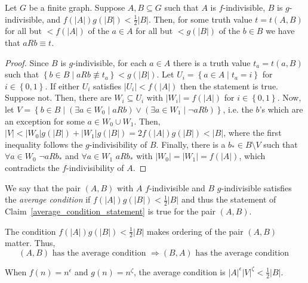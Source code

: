     \lemma[Claim 4.6)]\label{average_condition_statement}
    Let $G$ be a finite graph.
    Suppose $A, B \subseteq G$ such that $A$ is $f$-indivisible, $B$ is $g$-indivisible, and $f(|A|) g(|B|) < \frac{1}{2} |B|$.
    Then, for some truth value $t = t(A,B)$ for all but $< f(|A|)$ of the $a \in A$ for all but $< g(|B|)$ of the $b \in B$
        we have that $a R b \equiv t$.
        \begin{proof}
            Since $B$ is $g$-indivisible, for each $a \in A$ there is a truth value $t_a = t(a,B)$ such that
                $\left\{ b \in B \mid a R b \not\equiv t_a \right\} < g(|B|)$.
            Let $U_i = \left\{ a \in A \mid t_a = i \right\}$ for $i \in \left\{ 0,1 \right\}$.
            If either $U_i$ satisfies $|U_i| < f(|A|)$ then the statement is true.
            Suppose not.
            Then, there are $W_i \subseteq U_i$ with $|W_i| = f(|A|)$ for $i \in \left\{ 0,1 \right\}$.
            Now, let $V = \left\{ b \in B \mid (\exists a \in W_0 \mid a R b) \vee (\exists a \in W_1 \mid \lnot a R b) \right\}$,
                i.e. the $b$'s which are an exception for some $a \in W_0 \cup W_1$.
            Then, $|V| < |W_0| g(|B|) + |W_1| g(|B|) = 2 f(|A|) g(|B|) < |B|$, where the first inequality follows the
                $g$-indivisibility of $B$.
            Finally, there is a $b_* \in B \setminus V$ such that $\forall a \in W_0$ $\lnot a R b_*$ and
                $\forall a \in W_1$ $a R b_*$ with $|W_0| = |W_1| = f(|A|)$, which contradicts the $f$-indivisibility of $A$.
        \end{proof}

    We say that the pair $(A,B)$ with $A$ $f$-indivisible and $B$ $g$-indivisible satisfies the \emph{average condition} if
        $f(|A|) g(|B|) < \frac{1}{2} |B|$ and thus the statement of Claim~\ref{average_condition_statement} is true for
        the pair $(A,B)$.

    \remark
    The condition $f(|A|) g(|B|) < \frac{1}{2} |B|$ makes ordering of the pair $(A,B)$ matter.
    Thus,
    \[
        (A,B) \text{ has the average condition } \Rightarrow (B,A) \text{ has the average condition }
    \]

    \remark[Remark 4.7]\label{sufficient_requirement_for_average_condition}
        When $f(n) = n^\epsilon$ and $g(n) = n^\zeta$, the average condition is $|A|^\epsilon |V|^\zeta < \frac{1}{2} |B|$.


